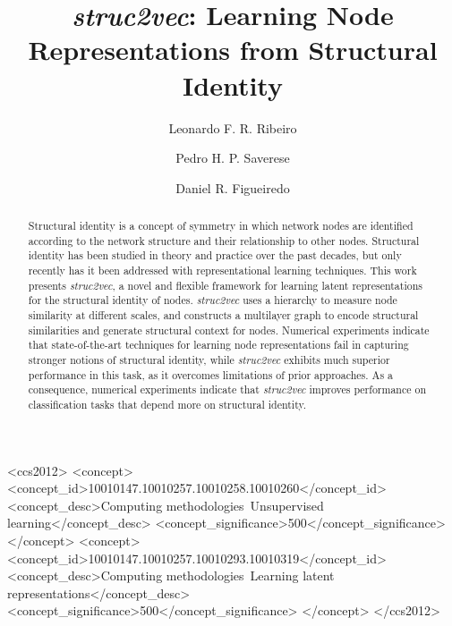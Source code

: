 \documentclass[sigconf]{acmart}
\begin{document}
\title{\textit{struc2vec}: Learning Node Representations from Structural Identity}

\author{Leonardo F. R. Ribeiro}

\author{Pedro H. P. Saverese}

\author{Daniel R. Figueiredo}


\begin{abstract}
Structural identity is a concept of symmetry in which network nodes are identified according to the network structure and their relationship to other nodes. Structural identity has been studied in theory and practice over the past decades, but only recently has it been addressed with representational learning techniques. This work presents \textit{struc2vec}, a novel and flexible framework for learning latent representations for the structural identity of nodes. \textit{struc2vec} uses a hierarchy to measure node similarity at different scales, and constructs a multilayer graph to encode structural similarities and generate structural context for nodes. Numerical experiments indicate that state-of-the-art techniques for learning node representations fail in capturing stronger notions of structural identity, while \textit{struc2vec} exhibits much superior performance in this task, as it overcomes limitations of prior approaches. As a consequence, numerical experiments indicate that \textit{struc2vec} improves performance on classification tasks that depend more on structural identity. 
\end{abstract}

\begin{CCSXML}
<ccs2012>
<concept>
<concept_id>10010147.10010257.10010258.10010260</concept_id>
<concept_desc>Computing methodologies~Unsupervised learning</concept_desc>
<concept_significance>500</concept_significance>
</concept>
<concept>
<concept_id>10010147.10010257.10010293.10010319</concept_id>
<concept_desc>Computing methodologies~Learning latent representations</concept_desc>
<concept_significance>500</concept_significance>
</concept>
</ccs2012>  
\end{CCSXML}
\end{document}
